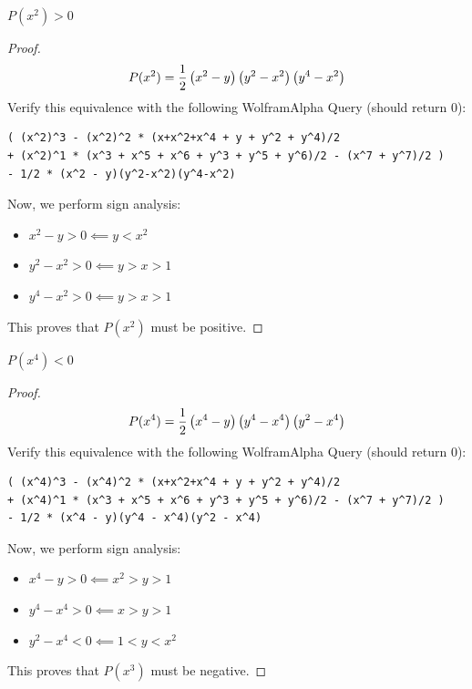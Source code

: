 \documentclass[10pt]{../usamts}
\begin{document}
\begin{solution}{4}
\begin{claim}
    $P(x^2) > 0$
    \label{claim:px2}
\end{claim}
\begin{proof}
    $$P(x^2) = \frac{1}{2} \left( x^2-y \right)\left( y^2 - x^2 \right)\left( y^4 - x^2 \right)$$
    Verify this equivalence with the following WolframAlpha Query (should return 0): 
    \begin{verbatim}
( (x^2)^3 - (x^2)^2 * (x+x^2+x^4 + y + y^2 + y^4)/2 
+ (x^2)^1 * (x^3 + x^5 + x^6 + y^3 + y^5 + y^6)/2 - (x^7 + y^7)/2 )
- 1/2 * (x^2 - y)(y^2-x^2)(y^4-x^2)
    \end{verbatim}
    Now, we perform sign analysis:
    \begin{itemize}
        \item $x^2 - y > 0 \impliedby y < x^2$
        \item $y^2 - x^2 > 0 \impliedby y > x > 1$
        \item $y^4 - x^2 > 0 \impliedby y > x > 1$
    \end{itemize}
    This proves that $P(x^2)$ must be positive.
\end{proof}

\begin{claim}
    $P(x^4) < 0$
    \label{claim:px4}
\end{claim}
\begin{proof}
    $$P(x^4) = \frac{1}{2} \left( x^4-y \right) \left( y^4 - x^4 \right)\left( y^2 - x^4 \right)$$ 
    Verify this equivalence with the following WolframAlpha Query (should return 0): 
    \begin{verbatim}
( (x^4)^3 - (x^4)^2 * (x+x^2+x^4 + y + y^2 + y^4)/2 
+ (x^4)^1 * (x^3 + x^5 + x^6 + y^3 + y^5 + y^6)/2 - (x^7 + y^7)/2 )
- 1/2 * (x^4 - y)(y^4 - x^4)(y^2 - x^4)
    \end{verbatim}
    Now, we perform sign analysis:
    \begin{itemize}
        \item $x^4 - y > 0 \impliedby x^2 > y > 1$
        \item $y^4 - x^4 > 0 \impliedby x > y > 1$
        \item $y^2 - x^4 < 0 \impliedby 1 < y < x^2$
    \end{itemize}
    This proves that $P(x^3)$ must be negative.
\end{proof}


\end{solution}
\end{document}
